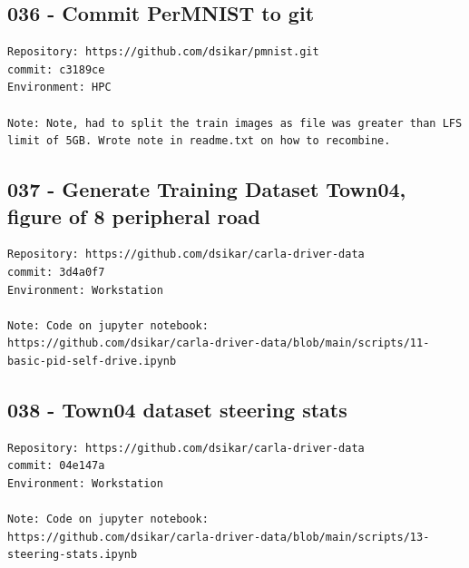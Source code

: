 \subsection{036 - Commit PerMNIST to git}
\label{app_res:036}
\begin{verbatim}
Repository: https://github.com/dsikar/pmnist.git
commit: c3189ce
Environment: HPC

Note: Note, had to split the train images as file was greater than LFS limit of 5GB. Wrote note in readme.txt on how to recombine.

\end{verbatim}

\subsection{037 - Generate Training Dataset Town04, figure of 8 peripheral road}
\label{app_res:037}
\begin{verbatim}
Repository: https://github.com/dsikar/carla-driver-data
commit: 3d4a0f7
Environment: Workstation

Note: Code on jupyter notebook:
https://github.com/dsikar/carla-driver-data/blob/main/scripts/11-basic-pid-self-drive.ipynb

\end{verbatim}

\subsection{038 - Town04 dataset steering stats}
\label{app_res:038}
\begin{verbatim}
Repository: https://github.com/dsikar/carla-driver-data
commit: 04e147a
Environment: Workstation

Note: Code on jupyter notebook:
https://github.com/dsikar/carla-driver-data/blob/main/scripts/13-steering-stats.ipynb

\end{verbatim}

